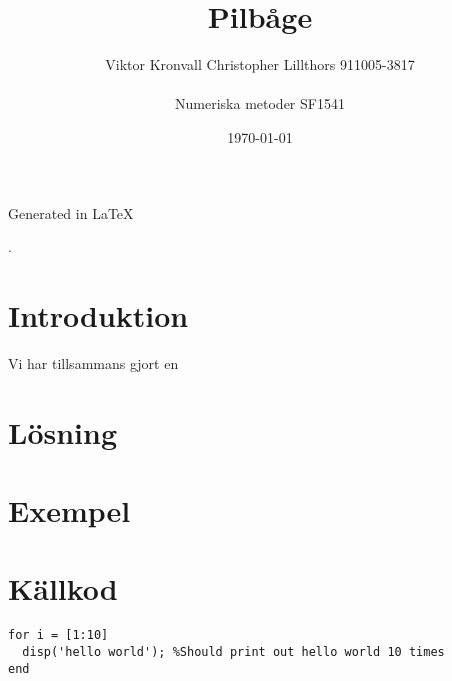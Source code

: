 \documentclass[a4paper,11pt,twoside]{article}
\title{Pilbåge}
\author{
  Viktor Kronvall %
  Christopher Lillthors 911005-3817 \\
  \\
  Numeriska metoder SF1541
}
\date{\today}
\begin{document}
\maketitle
\tableofcontents
\begin{frame}
\null
\vfill
Generated in \LaTeX
\end{frame}
\thispagestyle{empty}.
\newpage
\clearpage
\setcounter{page}{1}

\section{Introduktion}
Vi har tillsammans gjort en
\section{Lösning}

\section{Exempel}

\section{Källkod}
\begin{lstlisting}[caption = {Hello world}]
for i = [1:10]
  disp('hello world'); %Should print out hello world 10 times
end
\end{lstlisting}
\end{document}
